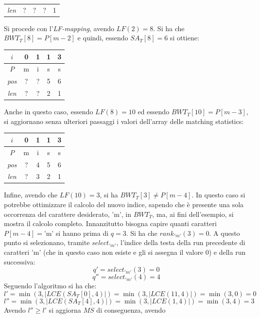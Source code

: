 \begin{esempio}
\begin{table}[H]
\begin{tabular}{c||c|c|c|c}
      \textit{len} & ? & ? & ? & 1\\
    \end{tabular}
  \end{table}
  Si procede con l'\textit{LF-mapping}, avendo $LF(2)=8$. Si ha che
  $BWT_T[8]=P[m-2]$ e quindi, essendo $SA_T[8]=6$ si ottiene:
  \begin{table}[H]
    \centering
    \begin{tabular}{c||c|c|c|c}
      $i$ & 0 & 1 & 1 & 3 \\
      \hline
      $P$ & m & i & s & s \\
      \hline
      \hline
      \textit{pos} & ? & ? & 5 & 6\\
      \hline
      \textit{len} & ? & ? & 2 & 1\\
    \end{tabular}
  \end{table}
  Anche in questo caso, essendo $LF(8)=10$ ed essendo $BWT_T[10]=P[m-3]$, si
  aggiornano senza ulteriori passaggi i valori dell'array delle matching
  statistics: 
  \begin{table}[H]
    \centering
    \begin{tabular}{c||c|c|c|c}
      $i$ & 0 & 1 & 1 & 3 \\
      \hline
      $P$ & m & i & s & s \\
      \hline
      \hline
      \textit{pos} & ? & 4 & 5 & 6\\
      \hline
      \textit{len} & ? & 3 & 2 & 1\\
    \end{tabular}
  \end{table}
  Infine, avendo che $LF(10)=3$, si ha $BWT_T[3]\neq P[m-4]$. In questo caso si
  potrebbe ottimizzare il calcolo del nuovo indice, sapendo che è presente una
  sola occorrenza del carattere desiderato, $\mbox{'m'}$, in $BWT_T$, ma, ai
  fini dell'esempio, si mostra il calcolo completo. Innanzitutto bisogna capire
  quanti caratteri $P[m-4]=\mbox{'m'}$ si hanno prima di $q=3$. Si ha che
  $rank_{'m'}(3)=0$. A questo punto si selezionano, tramite $select_{'m'}$,
  l'indice della
  testa della run precedente di caratteri $\mbox{'m'}$ (che in questo caso non
  esiste e gli si assegna il valore 0) e della run successiva:
  \[q'=select_{'m'}(3)=0\]
  \[q''=select_{'m'}(4)=4\]
  Seguendo l'algoritmo si ha che:
  \[l'=\min(3,\left|LCE(SA_T[0],4)\right|)=\min(3,\left|LCE(11,4)\right|)
    =\min(3,0)=0\]
  \[l''=\min(3,\left|LCE(SA_T[4],4)\right|)=\min(3,\left|LCE(1,4)\right|)
    =\min(3,4)=3\]
  Avendo $l''\geq l'$ si aggiorna $MS$ di conseguenza, avendo

\end{esempio}
